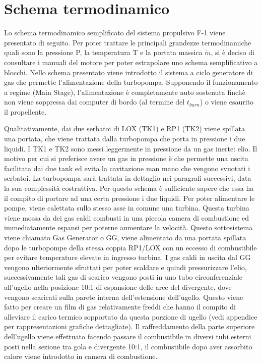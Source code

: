 \section{Schema termodinamico}
\label{sec:schema termodinamico}

Lo schema termodinamico semplificato del sistema propulsivo F-1 viene presentato di seguito. Per poter trattare le principali grandezze termodinamiche quali sono la pressione P, la temperatura T e la portata massica $\dot{m}$, si è deciso di consultare i manuali del motore per poter estrapolare uno schema semplificativo a blocchi. Nello schema presentato viene introdotto il sistema a ciclo generatore di gas che permette l’alimentazione della turbopompa. Supponendo il funzionamento a regime (Main Stage), l’alimentazione è completamente auto sostenuta finchè non viene soppressa dai computer di bordo (al termine del $t_{burn}$) o viene esaurito il propellente. 

Qualitativamente, dai due serbatoi di LOX (TK1) e RP1 (TK2) viene spillata una portata, che viene trattata dalla turbopompa che porta in pressione i due liquidi. I TK1 e TK2 sono messi leggermente in pressione da un gas inerte: elio. Il motivo per cui si preferisce avere un gas in pressione è che permette una uscita facilitata dai due tank ed evita la cavitazione man mano che vengono svuotati i serbatoi. La turbopompa sarà trattata in dettaglio nei paragrafi successivi, data la sua complessità costruttiva. Per questo schema è sufficiente sapere che essa ha il compito di portare ad una certa pressione i due liquidi. Per poter alimentare le pompe, viene calettata sullo stesso asse in comune una turbina. Questa turbina viene mossa da dei gas caldi combusti in una piccola camera di combustione ed immediatamente espansi per poterne aumentare la velocità. Questo sottosistema viene chiamato Gas Generator o GG, viene alimentato da una portata spillata dopo le turbopompe della stessa coppia RP1/LOX con un eccesso di combustibile per evitare temperature elevate in ingresso turbina. I gas caldi in uscita dal GG vengono ulteriormente sfruttati per poter scaldare e quindi pressurizzare l’elio, successivamente tali gas di scarico vengono posti in uno tubo circonferenziale all’ugello nella posizione 10:1 di espansione delle aree del divergente, dove vengono scaricati sulla parete interna dell’estensione dell’ugello. Questo viene fatto per creare un film di gas relativamente freddi che hanno il compito di alleviare il carico termico sopportato da questa porzione di ugello (vedi appendice per rappresentazioni grafiche dettagliate). Il raffreddamento della parte superiore dell’ugello viene effettuato facendo passare il combustibile in diversi tubi esterni posti nella sezione tra gola e divergente 10:1, il combustibile dopo aver assorbito calore viene introdotto in camera di combustione. 